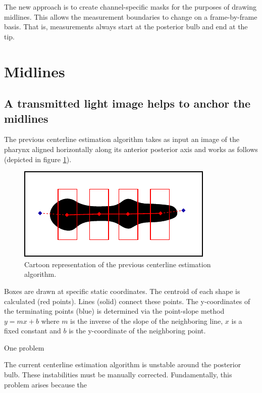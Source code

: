 The new approach is to create channel-specific masks for the purposes of drawing midlines. This allows the measurement boundaries to change on a frame-by-frame basis. That is, measurements always start at the posterior bulb and end at the tip.

\section{Midlines} 
\subsection{A transmitted light image helps to anchor the midlines} \label{TLMidlines}

The previous centerline estimation algorithm takes as input an image of the pharynx aligned horizontally along its anterior posterior axis and works as follows (depicted in figure \ref{fig:oldMidline}).

\begin{figure}[ht]
    \centering
    \includegraphics[scale=1.5]{Figures/rendered_files/old_midline_algorithm}
    \decoRule
    \caption[Previous centerline estimation algorithm]{Cartoon representation of the previous centerline estimation algorithm.}
    \label{fig:oldMidline}
\end{figure}

Boxes are drawn at specific static coordinates. The centroid of each shape is calculated (red points). Lines (solid) connect these points. The y-coordinates of the terminating points (blue) is determined via the point-slope method $y=mx+b$ where $m$ is the inverse of the slope of the neighboring line, $x$ is a fixed constant and $b$ is the y-coordinate of the neighboring point.

One problem 

The current centerline estimation algorithm is unstable around the posterior bulb. These instabilities must be manually corrected. Fundamentally, this problem arises because the  

